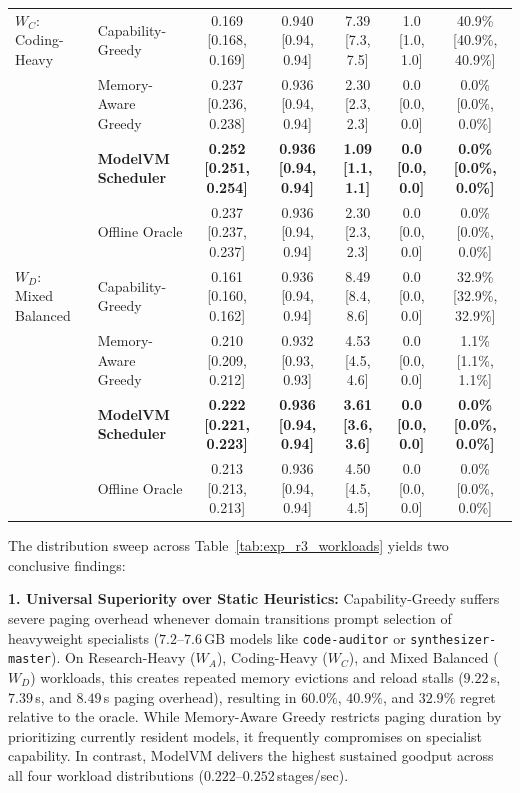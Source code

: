 \begin{table}[t]
{\begin{tabular}{llccccc}
\midrule
$W_C$: Coding-Heavy & Capability-Greedy & 0.169 [0.168, 0.169] & 0.940 [0.94, 0.94] & 7.39 [7.3, 7.5] & 1.0 [1.0, 1.0] & 40.9\% [40.9\%, 40.9\%] \\
 & Memory-Aware Greedy & 0.237 [0.236, 0.238] & 0.936 [0.94, 0.94] & 2.30 [2.3, 2.3] & 0.0 [0.0, 0.0] & 0.0\% [0.0\%, 0.0\%] \\
 & \textbf{ModelVM Scheduler} & \textbf{0.252 [0.251, 0.254]} & \textbf{0.936 [0.94, 0.94]} & \textbf{1.09 [1.1, 1.1]} & \textbf{0.0 [0.0, 0.0]} & \textbf{0.0\% [0.0\%, 0.0\%]} \\
 & Offline Oracle & 0.237 [0.237, 0.237] & 0.936 [0.94, 0.94] & 2.30 [2.3, 2.3] & 0.0 [0.0, 0.0] & 0.0\% [0.0\%, 0.0\%] \\
\midrule
$W_D$: Mixed Balanced & Capability-Greedy & 0.161 [0.160, 0.162] & 0.936 [0.94, 0.94] & 8.49 [8.4, 8.6] & 0.0 [0.0, 0.0] & 32.9\% [32.9\%, 32.9\%] \\
 & Memory-Aware Greedy & 0.210 [0.209, 0.212] & 0.932 [0.93, 0.93] & 4.53 [4.5, 4.6] & 0.0 [0.0, 0.0] & 1.1\% [1.1\%, 1.1\%] \\
 & \textbf{ModelVM Scheduler} & \textbf{0.222 [0.221, 0.223]} & \textbf{0.936 [0.94, 0.94]} & \textbf{3.61 [3.6, 3.6]} & \textbf{0.0 [0.0, 0.0]} & \textbf{0.0\% [0.0\%, 0.0\%]} \\
 & Offline Oracle & 0.213 [0.213, 0.213] & 0.936 [0.94, 0.94] & 4.50 [4.5, 4.5] & 0.0 [0.0, 0.0] & 0.0\% [0.0\%, 0.0\%] \\
\bottomrule
\end{tabular}%
}
\end{table}

The distribution sweep across Table~\ref{tab:exp_r3_workloads} yields two conclusive findings:

\textbf{1. Universal Superiority over Static Heuristics:} Capability-Greedy suffers severe paging overhead whenever domain transitions prompt selection of heavyweight specialists ($7.2\text{--}7.6$\,GB models like \texttt{code-auditor} or \texttt{synthesizer-master}). On Research-Heavy ($W_A$), Coding-Heavy ($W_C$), and Mixed Balanced ($W_D$) workloads, this creates repeated memory evictions and reload stalls ($9.22$\,s, $7.39$\,s, and $8.49$\,s paging overhead), resulting in $60.0\%$, $40.9\%$, and $32.9\%$ regret relative to the oracle. While Memory-Aware Greedy restricts paging duration by prioritizing currently resident models, it frequently compromises on specialist capability. In contrast, ModelVM delivers the highest sustained goodput across all four workload distributions ($0.222\text{--}0.252$\,stages/sec).

